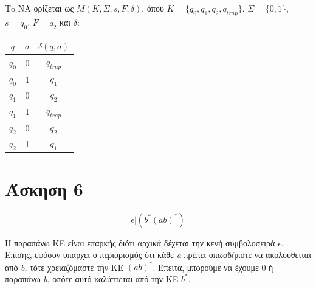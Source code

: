 \documentclass[12pt]{article}
\begin{document}
\begin{center}
\end{center}

Τo ΝΑ ορίζεται ως $Μ(Κ,Σ,s,F,δ)$, όπου $K = \{q_0,q_1,q_2, q_{trap}\}$, $Σ = \{0,1\}$,
$s = q_0$, $F = q_2$ και $δ$:

\begin{center}
\begin{tabular}{ccc}
	$q$ & $σ$ & $δ(q, σ)$ \\
	\hline
	$q_0$ & 0 & $q_{trap}$ \\
	$q_0$ & 1 & $q_1$ \\
	$q_1$ & 0 & $q_2$ \\
	$q_1$ & 1 & $q_{trap}$ \\
	$q_2$ & 0 & $q_2$ \\
	$q_2$ & 1 & $q_1$ \\
\end{tabular}
\end{center}

\section{Άσκηση 6}

\[
	\epsilon|(b^*(ab)^*)
\]

Η παραπάνω ΚΕ είναι επαρκής διότι αρχικά δέχεται την κενή συμβολοσειρά
$\epsilon$. Επίσης, εφόσον υπάρχει ο περιορισμός ότι κάθε \textit{a} πρέπει
οπωσδήποτε να ακολουθείται από \textit{b}, τότε χρειαζόμαστε την ΚΕ $(ab)^*$.
Έπειτα, μπορούμε να έχουμε 0 ή παραπάνω \textit{b}, οπότε αυτό καλύπτεται από
την ΚΕ $b^*$.
\end{document}
